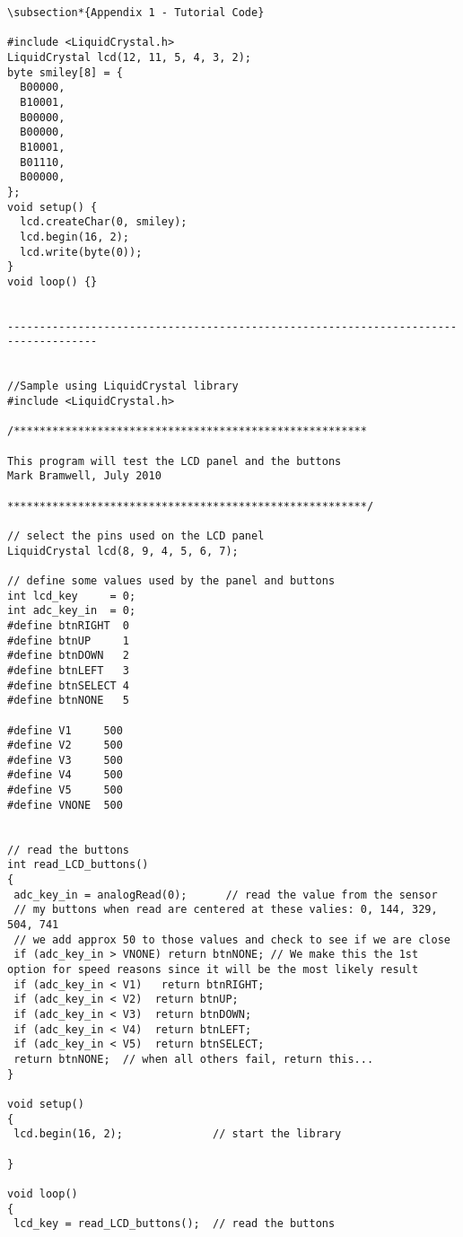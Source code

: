 \documentclass[10pt]{report}
\begin{document}
\begin{verbatim}
\subsection*{Appendix 1 - Tutorial Code}

#include <LiquidCrystal.h>
LiquidCrystal lcd(12, 11, 5, 4, 3, 2);
byte smiley[8] = {
  B00000,
  B10001,
  B00000,
  B00000,
  B10001,
  B01110,
  B00000,
};
void setup() {
  lcd.createChar(0, smiley);
  lcd.begin(16, 2);  
  lcd.write(byte(0));
}
void loop() {}


------------------------------------------------------------------------------------


//Sample using LiquidCrystal library
#include <LiquidCrystal.h>
 
/*******************************************************
 
This program will test the LCD panel and the buttons
Mark Bramwell, July 2010
 
********************************************************/
 
// select the pins used on the LCD panel
LiquidCrystal lcd(8, 9, 4, 5, 6, 7);
 
// define some values used by the panel and buttons
int lcd_key     = 0;
int adc_key_in  = 0;
#define btnRIGHT  0
#define btnUP     1
#define btnDOWN   2
#define btnLEFT   3
#define btnSELECT 4
#define btnNONE   5

#define V1     500
#define V2     500
#define V3     500
#define V4     500
#define V5     500
#define VNONE  500

 
// read the buttons
int read_LCD_buttons()
{
 adc_key_in = analogRead(0);      // read the value from the sensor 
 // my buttons when read are centered at these valies: 0, 144, 329, 504, 741
 // we add approx 50 to those values and check to see if we are close
 if (adc_key_in > VNONE) return btnNONE; // We make this the 1st option for speed reasons since it will be the most likely result
 if (adc_key_in < V1)   return btnRIGHT;  
 if (adc_key_in < V2)  return btnUP; 
 if (adc_key_in < V3)  return btnDOWN; 
 if (adc_key_in < V4)  return btnLEFT; 
 if (adc_key_in < V5)  return btnSELECT;   
 return btnNONE;  // when all others fail, return this...
}
 
void setup()
{
 lcd.begin(16, 2);              // start the library

}
  
void loop()
{ 
 lcd_key = read_LCD_buttons();  // read the buttons
 

\end{verbatim}
\end{document}
